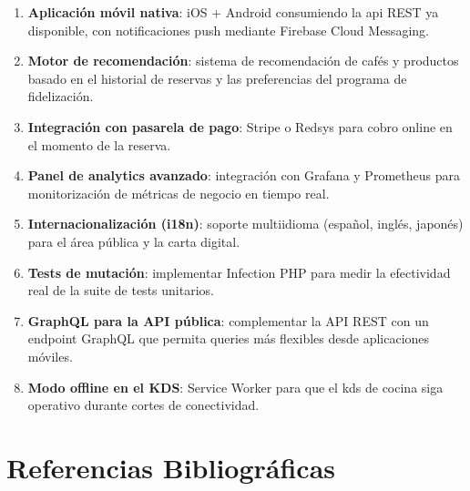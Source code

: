 \documentclass[12pt,a4paper,twoside,openright]{report}
\begin{document}
\begin{enumerate}
  \item \textbf{Aplicación móvil nativa}: iOS + Android consumiendo la \gls{api} REST
    ya disponible, con notificaciones push mediante Firebase Cloud Messaging.
  \item \textbf{Motor de recomendación}: sistema de recomendación de cafés y productos
    basado en el historial de reservas y las preferencias del programa de fidelización.
  \item \textbf{Integración con pasarela de pago}: Stripe o Redsys para cobro online
    en el momento de la reserva.
  \item \textbf{Panel de analytics avanzado}: integración con Grafana y Prometheus
    para monitorización de métricas de negocio en tiempo real.
  \item \textbf{Internacionalización (i18n)}: soporte multiidioma (español, inglés,
    japonés) para el área pública y la carta digital.
  \item \textbf{Tests de mutación}: implementar Infection PHP para medir la efectividad
    real de la suite de tests unitarios.
  \item \textbf{GraphQL para la API pública}: complementar la API REST con un endpoint
    GraphQL que permita queries más flexibles desde aplicaciones móviles.
  \item \textbf{Modo offline en el KDS}: Service Worker para que el \gls{kds} de cocina
    siga operativo durante cortes de conectividad.
\end{enumerate}

\chapter{Referencias Bibliográficas}
\label{chap:refs}

\printbibliography[heading=none]

\end{document}
